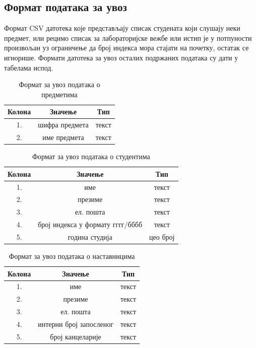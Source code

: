 \documentclass[a4paper, 12pt, diplomski]{etfcyr}
\begin{document}
			\subsection{Формат података за увоз}
				\begin{justify}
					Формат CSV датотека које представљају списак студената који слушају неки предмет, или рецимо списак за лабораторијске вежбе или истип је у потпуности произвољан уз ограничење да број индекса мора стајати на почетку, остатак се игнорише.
					Формати датотека за увоз осталих подржаних података су дати у табелама испод.
				\end{justify}
				\begin{table}[H]
					\centering
					\begin{tabular}{ c|c|c }
						Колона & Значење & Тип \\
						\hline\hline
						1. & шифра предмета & текст \\
						2. & име предмета & текст \\
						\hline
					\end{tabular}
					\caption{Формат за увоз података о предметима}
					\label{table:2}
				\end{table}
				\begin{table}[H]
					\centering
					\begin{tabular}{ c|c|c }
						Колона & Значење & Тип \\
						\hline\hline
						1. & име & текст \\
						2. & презиме & текст \\
						3. & ел. пошта & текст \\
						4. & број индекса у формату гггг/бббб & текст \\
						5. & година студија & цео број \\
						\hline
					\end{tabular}
					\caption{Формат за увоз података о студентима}
					\label{table:3}
				\end{table}
				\begin{table}[H]
					\centering
					\begin{tabular}{ c|c|c }
						Колона & Значење & Тип \\
						\hline\hline
						1. & име & текст \\
						2. & презиме & текст \\
						3. & ел. пошта & текст \\
						4. & интерни број запосленог & текст \\
						5. & број канцеларије & текст \\
						\hline
					\end{tabular}
					\caption{Формат за увоз података о наставницима}
					\label{table:4}
				\end{table}
\end{document}
